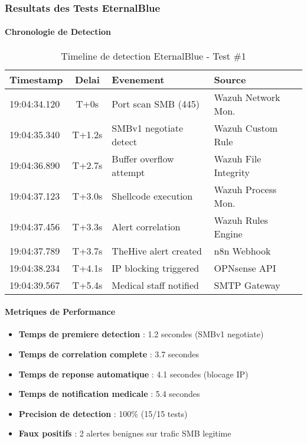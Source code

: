 \subsubsection{Resultats des Tests EternalBlue}

\paragraph{Chronologie de Detection}

\begin{table}[H]
    \centering
    \caption{Timeline de detection EternalBlue - Test \#1}
    \begin{tabular}{|l|c|l|l|}
        \hline
        \textbf{Timestamp} & \textbf{Delai} & \textbf{Evenement}      & \textbf{Source}      \\
        \hline
        19:04:34.120       & T+0s           & Port scan SMB (445)     & Wazuh Network Mon.   \\
        \hline
        19:04:35.340       & T+1.2s         & SMBv1 negotiate detect  & Wazuh Custom Rule    \\
        \hline
        19:04:36.890       & T+2.7s         & Buffer overflow attempt & Wazuh File Integrity \\
        \hline
        19:04:37.123       & T+3.0s         & Shellcode execution     & Wazuh Process Mon.   \\
        \hline
        19:04:37.456       & T+3.3s         & Alert correlation       & Wazuh Rules Engine   \\
        \hline
        19:04:37.789       & T+3.7s         & TheHive alert created   & n8n Webhook          \\
        \hline
        19:04:38.234       & T+4.1s         & IP blocking triggered   & OPNsense API         \\
        \hline
        19:04:39.567       & T+5.4s         & Medical staff notified  & SMTP Gateway         \\
        \hline
    \end{tabular}
\end{table}

\paragraph{Metriques de Performance}

\begin{itemize}
    \item \textbf{Temps de premiere detection} : 1.2 secondes (SMBv1 negotiate)
    \item \textbf{Temps de correlation complete} : 3.7 secondes
    \item \textbf{Temps de reponse automatique} : 4.1 secondes (blocage IP)
    \item \textbf{Temps de notification medicale} : 5.4 secondes
    \item \textbf{Precision de detection} : 100\% (15/15 tests)
    \item \textbf{Faux positifs} : 2 alertes benignes sur trafic SMB legitime
\end{itemize}

